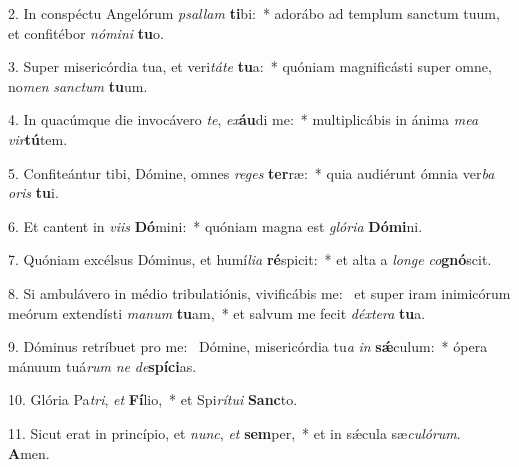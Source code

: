 2. In conspéctu Angelórum \textit{psal}\textit{lam} \textbf{ti}bi:~*  adorábo ad templum sanctum tuum, et confitébor \textit{nó}\textit{mi}\textit{ni} \textbf{tu}o.\

3. Super misericórdia tua, et veri\textit{tá}\textit{te} \textbf{tu}a:~*  quóniam magnificásti super omne, no\textit{men} \textit{sanc}\textit{tum} \textbf{tu}um.\

4. In quacúmque die invocávero \textit{te}, \textit{ex}\textbf{áu}di me:~*  multiplicábis in ánima \textit{me}\textit{a} \textit{vir}\textbf{tú}tem.\

5. Confiteántur tibi, Dómine, omnes \textit{re}\textit{ges} \textbf{ter}ræ:~*  quia audiérunt ómnia ver\textit{ba} \textit{o}\textit{ris} \textbf{tu}i.\

6. Et cantent in \textit{vi}\textit{is} \textbf{Dó}mini:~*  quóniam magna est \textit{gló}\textit{ri}\textit{a} \textbf{Dó}\textbf{mi}ni.\

7. Quóniam excélsus Dóminus, et humí\textit{li}\textit{a} \textbf{ré}spicit:~*  et alta a \textit{lon}\textit{ge} \textit{co}\textbf{gnó}scit.\

8. Si ambulávero in médio tribulatiónis, vivificábis me: \dag\  et super iram inimicórum meórum extendísti \textit{ma}\textit{num} \textbf{tu}am,~*  et salvum me fecit \textit{déx}\textit{te}\textit{ra} \textbf{tu}a.\

9. Dóminus retríbuet pro me: \dag\  Dómine, misericórdia tu\textit{a} \textit{in} \textbf{sǽ}culum:~*  ópera mánuum tuá\textit{rum} \textit{ne} \textit{de}\textbf{spí}\textbf{ci}as.\

10. Glória Pa\textit{tri}, \textit{et} \textbf{Fí}lio,~*  et Spi\textit{rí}\textit{tu}\textit{i} \textbf{Sanc}to.\

11. Sicut erat in princípio, et \textit{nunc}, \textit{et} \textbf{sem}per,~*  et in sǽcula sæ\textit{cu}\textit{ló}\textit{rum}. \textbf{A}men.\

